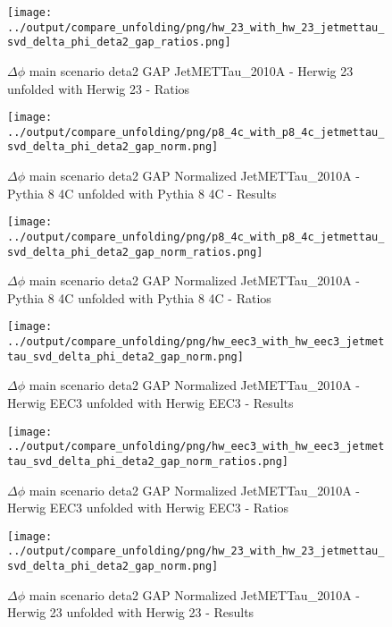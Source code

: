 \documentclass[11pt]{book}
\begin{document}
\begin{figure}[ht]
\centering
\texttt{[image: ../output/compare\_unfolding/png/hw\_23\_with\_hw\_23\_jetmettau\_svd\_delta\_phi\_deta2\_gap\_ratios.png]}
\caption{$\Delta\phi$ main scenario deta2 GAP JetMETTau\_2010A - Herwig 23 unfolded with Herwig 23 - Ratios}
\label{hw_23_hw_23_jetmettau_svd_delta_phi_deta2_gap_b}
\end{figure}


\begin{figure}[ht]
\centering
\texttt{[image: ../output/compare\_unfolding/png/p8\_4c\_with\_p8\_4c\_jetmettau\_svd\_delta\_phi\_deta2\_gap\_norm.png]}
\caption{$\Delta\phi$ main scenario deta2 GAP Normalized JetMETTau\_2010A - Pythia 8 4C unfolded with Pythia 8 4C - Results}
\label{p8_p8_jetmettau_svd_delta_phi_deta2_gap_norm_a}
\end{figure}

\begin{figure}[ht]
\centering
\texttt{[image: ../output/compare\_unfolding/png/p8\_4c\_with\_p8\_4c\_jetmettau\_svd\_delta\_phi\_deta2\_gap\_norm\_ratios.png]}
\caption{$\Delta\phi$ main scenario deta2 GAP Normalized JetMETTau\_2010A - Pythia 8 4C unfolded with Pythia 8 4C - Ratios}
\label{p8_p8_jetmettau_svd_delta_phi_deta2_gap_norm_b}
\end{figure}

\begin{figure}[ht]
\centering
\texttt{[image: ../output/compare\_unfolding/png/hw\_eec3\_with\_hw\_eec3\_jetmettau\_svd\_delta\_phi\_deta2\_gap\_norm.png]}
\caption{$\Delta\phi$ main scenario deta2 GAP Normalized JetMETTau\_2010A - Herwig EEC3 unfolded with Herwig EEC3 - Results}
\label{hw_eec3_hw_eec3_jetmettau_svd_delta_phi_deta2_gap_norm_a}
\end{figure}

\begin{figure}[ht]
\centering
\texttt{[image: ../output/compare\_unfolding/png/hw\_eec3\_with\_hw\_eec3\_jetmettau\_svd\_delta\_phi\_deta2\_gap\_norm\_ratios.png]}
\caption{$\Delta\phi$ main scenario deta2 GAP Normalized JetMETTau\_2010A - Herwig EEC3 unfolded with Herwig EEC3 - Ratios}
\label{hw_eec3_hw_eec3_jetmettau_svd_delta_phi_deta2_gap_norm_b}
\end{figure}

\begin{figure}[ht]
\centering
\texttt{[image: ../output/compare\_unfolding/png/hw\_23\_with\_hw\_23\_jetmettau\_svd\_delta\_phi\_deta2\_gap\_norm.png]}
\caption{$\Delta\phi$ main scenario deta2 GAP Normalized JetMETTau\_2010A - Herwig 23 unfolded with Herwig 23 - Results}
\label{hw_23_hw_23_jetmettau_svd_delta_phi_deta2_gap_norm_a}
\end{figure}
\end{document}
